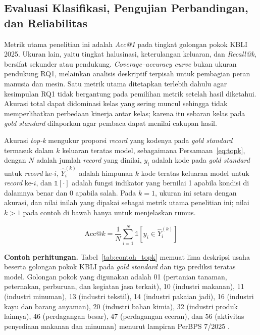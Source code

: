 \subsection{Evaluasi Klasifikasi, Pengujian Perbandingan, dan Reliabilitas}
\label{sec:evaluasi-klasifikasi}

Metrik utama penelitian ini adalah \textit{Acc@1} pada tingkat golongan pokok KBLI 2025. Ukuran lain, yaitu tingkat halusinasi, keterulangan keluaran, dan \textit{Recall@k}, bersifat sekunder atau pendukung. \textit{Coverage--accuracy curve} bukan ukuran pendukung RQ1, melainkan analisis deskriptif terpisah untuk pembagian peran manusia dan mesin. Satu metrik utama ditetapkan terlebih dahulu agar kesimpulan RQ1 tidak bergantung pada pemilihan metrik setelah hasil diketahui. Akurasi total dapat didominasi kelas yang sering muncul sehingga tidak memperlihatkan perbedaan kinerja antar kelas; karena itu sebaran kelas pada \textit{gold standard} dilaporkan agar pembaca dapat menilai cakupan hasil.

Akurasi \textit{top-k} mengukur proporsi \textit{record} yang kodenya pada \textit{gold standard} termasuk dalam $k$ keluaran teratas model, sebagaimana Persamaan~\eqref{eq:topk}, dengan $N$ adalah jumlah \textit{record} yang dinilai, $y_i$ adalah kode pada \textit{gold standard} untuk \textit{record} ke-$i$, $\hat{Y}_i^{(k)}$ adalah himpunan $k$ kode teratas keluaran model untuk \textit{record} ke-$i$, dan $\mathbb{1}[\cdot]$ adalah fungsi indikator yang bernilai 1 apabila kondisi di dalamnya benar dan 0 apabila salah. Pada $k=1$, ukuran ini setara dengan akurasi, dan nilai inilah yang dipakai sebagai metrik utama penelitian ini; nilai $k>1$ pada contoh di bawah hanya untuk menjelaskan rumus.

\begin{equation}
  \text{Acc@}k = \frac{1}{N}\sum_{i=1}^{N} \mathbb{1}\left[y_i \in \hat{Y}_i^{(k)}\right]
  \label{eq:topk}
\end{equation}

\noindent\textbf{Contoh perhitungan.} Tabel~\ref{tab:contoh_topk} memuat lima deskripsi usaha beserta golongan pokok KBLI pada \textit{gold standard} dan tiga prediksi teratas model. Golongan pokok yang digunakan adalah 01 (pertanian tanaman, peternakan, perburuan, dan kegiatan jasa terkait), 10 (industri makanan), 11 (industri minuman), 13 (industri tekstil), 14 (industri pakaian jadi), 16 (industri kayu dan barang anyaman), 20 (industri bahan kimia), 32 (industri produk lainnya), 46 (perdagangan besar), 47 (perdagangan eceran), dan 56 (aktivitas penyediaan makanan dan minuman) menurut lampiran PerBPS 7/2025 \cite{bps2025perban7}.

